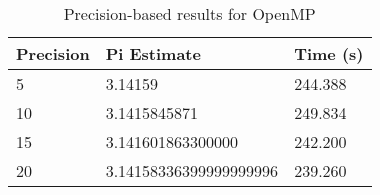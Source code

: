 \begin{table}[H]
\centering
\caption{Precision-based results for OpenMP}
\label{tab:openmp-precision}
\begin{tabular}{|l|l|l|}
\hline
Precision & Pi Estimate & Time (s) \\
\hline
5 & 3.14159 & 244.388 \\
10 & 3.1415845871 & 249.834 \\
15 & 3.141601863300000 & 242.200 \\
20 & 3.14158336399999999996 & 239.260 \\
\hline
\end{tabular}
\end{table}
